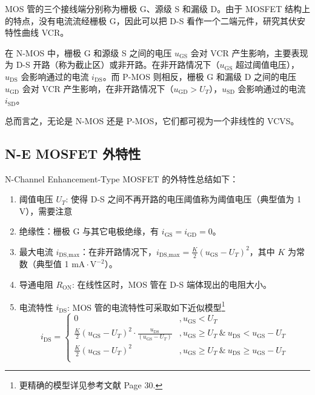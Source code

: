 \documentclass[UTF8]{report}
\theoremstyle{MyLineTheoremStyle} %
\theoremstyle{MyBlockTheoremStyle} %
\theoremstyle{MySubsubsectionStyle} %
\begin{document}
MOS 管的三个接线端分别称为栅极 G、源级 S 和漏级 D。由于 MOSFET 结构上的特点，没有电流流经栅极 G，因此可以把 D-S 看作一个二端元件，研究其伏安特性曲线 VCR。

在 N-MOS 中，栅极 G 和源级 S 之间的电压 $u_{\text{GS}}$ 会对 VCR 产生影响，主要表现为 D-S 开路（称为截止区）或非开路。在非开路情况下（$u_{\text{GS}}$ 超过阈值电压），$u_{\text{DS}}$ 会影响通过的电流 $i_{\text{DS}}$。而 P-MOS 则相反，栅极 G 和漏级 D 之间的电压 $u_{\text{GD}}$ 会对 VCR 产生影响，在非开路情况下（$u_{\text{GD}} > U_T$），$u_{\text{SD}}$ 会影响通过的电流 $i_{\text{SD}}$。

总而言之，无论是 N-MOS 还是 P-MOS，它们都可视为一个非线性的 VCVS。

\subsection{N-E MOSFET 外特性}

N-Channel Enhancement-Type MOSFET 的外特性总结如下：
\begin{enumerate}
\item 阈值电压 $U_T$: 使得 D-S 之间不再开路的电压阈值称为阈值电压（典型值为 1 V），需要注意 
\item 绝缘性：栅极 G 与其它电极绝缘，有 $i_{\text{GS}} = i_{\text{GD}} = 0$。
\item 最大电流 $i_{\text{DS},\text{max}}$：在非开路情况下，$i_{\text{DS},\text{max}} = \frac{K}{2}(u_{\text{GS}} - U_T)^2$，其中 $K$ 为常数（典型值 1 $\mathrm{mA\cdot V^{-2}}$）。
\item 导通电阻 $R_{\text{ON}}$: 在线性区时，MOS 管在 D-S 端体现出的电阻大小。
\item 电流特性 $i_{\text{DS}}$: MOS 管的电流特性可采取如下近似模型\footnote{更精确的模型详见参考文献 \cite{电路原理导学导教} Page 30.}
\begin{equation}
i_{\text{DS}} = 
\begin{cases}
    0 &, u_{\text{GS}} < U_T \\
    \frac{K}{2}(u_{\text{GS}} - U_T)^2\cdot \frac{u_{\text{DS}}}{(u_{\text{GS}} - U_T)} &, u_{\text{GS}} \geq U_T\ \& \ u_{\text{DS}} < u_{\text{GS}} - U_T \\ 
    \frac{K}{2}(u_{\text{GS}} - U_T)^2 &, u_{\text{GS}} \geq U_T\ \& \ u_{\text{DS}} \geqslant u_{\text{GS}} - U_T \\ 
\end{cases}
\end{equation}
\end{enumerate}
\end{document}
